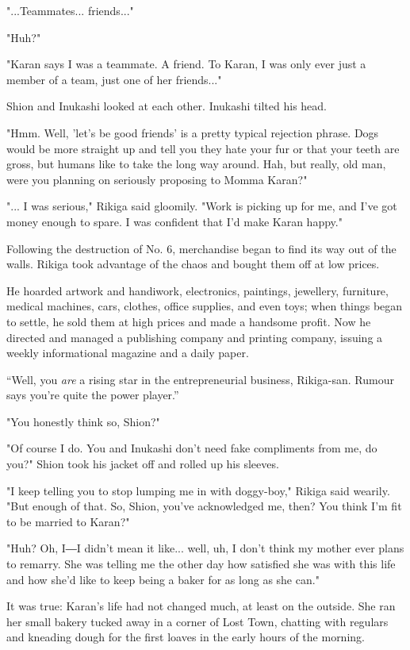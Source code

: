 "...Teammates... friends..."

"Huh?"

"Karan says I was a teammate. A friend. To Karan, I was only ever just a
member of a team, just one of her friends..."

Shion and Inukashi looked at each other. Inukashi tilted his head.

"Hmm. Well, 'let's be good friends' is a pretty typical rejection
phrase. Dogs would be more straight up and tell you they hate your fur
or that your teeth are gross, but humans like to take the long way
around. Hah, but really, old man, were you planning on seriously
proposing to Momma Karan?"

"... I was serious," Rikiga said gloomily. "Work is picking up for me,
and I've got money enough to spare. I was confident that I'd make Karan
happy."

Following the destruction of No. 6, merchandise began to find its way
out of the walls. Rikiga took advantage of the chaos and bought them off
at low prices.

He hoarded artwork and handiwork, electronics, paintings, jewellery,
furniture, medical machines, cars, clothes, office supplies, and even
toys; when things began to settle, he sold them at high prices and made
a handsome profit. Now he directed and managed a publishing company and
printing company, issuing a weekly informational magazine and a daily
paper.

``Well, you \emph{are} a rising star in the entrepreneurial business,
Rikiga-san. Rumour says you're quite the power player.''

"You honestly think so, Shion?"

"Of course I do. You and Inukashi don't need fake compliments from me,
do you?" Shion took his jacket off and rolled up his sleeves.

"I keep telling you to stop lumping me in with doggy-boy," Rikiga said
wearily. "But enough of that. So, Shion, you've acknowledged me, then?
You think I'm fit to be married to Karan?"

"Huh? Oh, I―I didn't mean it like... well, uh, I don't think my mother
ever plans to remarry. She was telling me the other day how satisfied
she was with this life and how she'd like to keep being a baker for as
long as she can."

It was true: Karan's life had not changed much, at least on the outside.
She ran her small bakery tucked away in a corner of Lost Town, chatting
with regulars and kneading dough for the first loaves in the early hours
of the morning.

